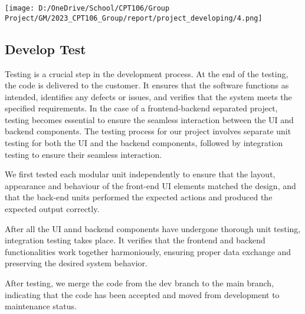 {\begin{center}
  \centering
  \texttt{[image: D:/OneDrive/School/CPT106/Group Project/GM/2023\_CPT106\_Group/report/project\_developing/4.png]}
\end{center}

\hypertarget{develop-test}{%
\subsection{Develop Test}\label{develop-test}}

Testing is a crucial step in the development process. At the end of the
testing, the code is delivered to the customer. It ensures that the
software functions as intended, identifies any defects or issues, and
verifies that the system meets the specified requirements. In the case
of a frontend-backend separated project, testing becomes essential to
ensure the seamless interaction between the UI and backend components.
The testing process for our project involves separate unit testing for
both the UI and the backend components, followed by integration testing
to ensure their seamless interaction.

We first tested each modular unit independently to ensure that the
layout, appearance and behaviour of the front-end UI elements matched
the design, and that the back-end units performed the expected actions
and produced the expected output correctly.

After all the UI annd backend components have undergone thorough unit
testing, integration testing takes place. It verifies that the frontend
and backend functionalities work together harmoniously, ensuring proper
data exchange and preserving the desired system behavior.

After testing, we merge the code from the dev branch to the main branch,
indicating that the code has been accepted and moved from development to
maintenance status.
}

